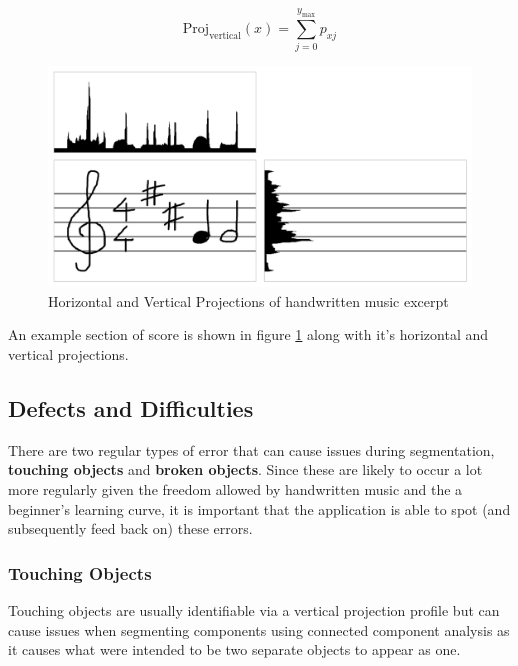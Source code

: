 \begin{equation} \label{eq:vproj}
  \text{Proj}_{\text{vertical}}(x) = \sum_{j = 0}^{y_\text{max}} p_{xj}
\end{equation}

\begin{figure}[h!]
  \centering
  \includegraphics[width=\linewidth]{gfx/background-omr/projection.png}
  \caption{Horizontal and Vertical Projections of handwritten music excerpt}
  \label{fig:stave-projection}
\end{figure}

An example section of score is shown in figure \ref{fig:stave-projection} along with it's horizontal and vertical projections.

\subsection{Defects and Difficulties}

There are two regular types of error that can cause issues during segmentation, \textbf{touching objects} and \textbf{broken objects}. Since these are likely to occur a lot more regularly given the freedom allowed by handwritten music and the a beginner's learning curve, it is important that the application is able to spot (and subsequently feed back on) these errors.

\subsubsection{Touching Objects}

Touching objects are usually identifiable via a vertical projection profile  but can cause issues when segmenting components using  connected component analysis as it causes what were intended to be two separate objects to appear as one.

